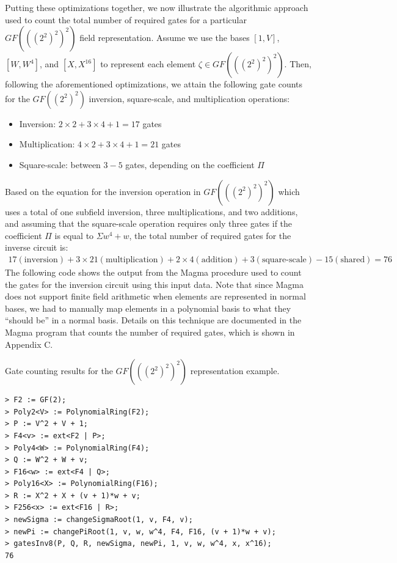 Putting these optimizations together, we now illustrate the algorithmic approach used to count the total number of required gates for a particular $GF(((2^2)^2)^2)$ field representation. Assume we use the bases $[1, V]$, $[W, W^4]$, and $[X, X^{16}]$ to represent each element $\zeta \in GF(((2^2)^2)^2)$. Then, following the aforementioned optimizations, we attain the following gate counts for the $GF((2^2)^2)$ inversion, square-scale, and multiplication operations:
\begin{itemize}
	\item Inversion: $2 \times 2 + 3 \times 4 + 1 = 17$ gates
	\item Multiplication: $4 \times 2 + 3 \times 4 + 1 = 21$ gates
	\item Square-scale: between $3-5$ gates, depending on the coefficient $\Pi$
\end{itemize}
Based on the equation for the inversion operation in $GF(((2^2)^2)^2)$ which uses a total of one subfield inversion, three multiplications, and two additions, and assuming that the square-scale operation requires only three gates if the coefficient $\Pi$ is equal to $\Sigma w^4 + w$, the total number of required gates for the inverse circuit is:
\begin{align*}
17 (\text{inversion}) + 3 \times 21 (\text{multiplication}) + 2 \times 4 (\text{addition}) + 3 (\text{square-scale}) - 15 (\text{shared}) = 76
\end{align*}
The following code shows the output from the Magma procedure used to count the gates for the inversion circuit using this input data. Note that since Magma does not support finite field arithmetic when elements are represented in normal bases, we had to manually map elements in a polynomial basis to what they ``should be'' in a normal basis. Details on this technique are documented in the Magma program that counts the number of required gates, which is shown in Appendix C.

\begin{listing}[ht!]
\caption{Gate counting results for the $GF(((2^2)^2)^2)$ representation example.}
\begin{verbatim}
> F2 := GF(2);
> Poly2<V> := PolynomialRing(F2);
> P := V^2 + V + 1;
> F4<v> := ext<F2 | P>;
> Poly4<W> := PolynomialRing(F4);
> Q := W^2 + W + v;
> F16<w> := ext<F4 | Q>;
> Poly16<X> := PolynomialRing(F16);
> R := X^2 + X + (v + 1)*w + v;
> F256<x> := ext<F16 | R>;
> newSigma := changeSigmaRoot(1, v, F4, v);                      
> newPi := changePiRoot(1, v, w, w^4, F4, F16, (v + 1)*w + v);   
> gatesInv8(P, Q, R, newSigma, newPi, 1, v, w, w^4, x, x^16);
76
\end{verbatim}
\label{lst:gf28gateCountCode}
\end{listing}

